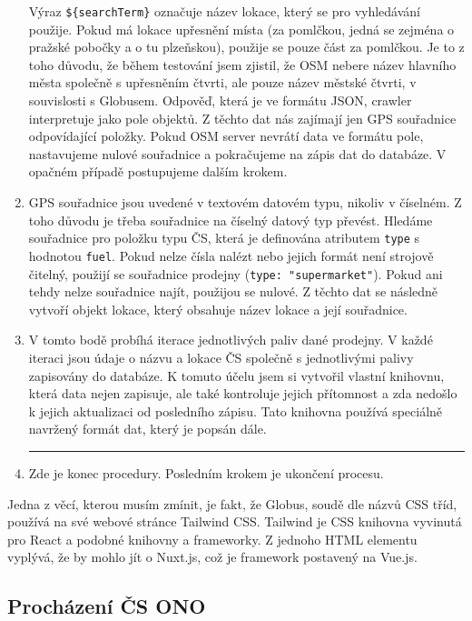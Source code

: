 \begin{enumerate}
        Výraz \texttt{\$\{searchTerm\}} označuje název lokace, který
        se pro vyhledávání použije. Pokud má lokace upřesnění místa
        (za pomlčkou, jedná se zejména o pražské pobočky a o tu plzeňskou),
        použije se pouze část za pomlčkou. Je to z toho důvodu, že během
        testování jsem zjistil, že OSM nebere název hlavního města společně
        s upřesněním čtvrti, ale pouze název městské čtvrti, v souvislosti
        s Globusem. Odpověď, která je ve formátu JSON, crawler interpretuje
        jako pole objektů. Z těchto dat nás zajímají jen GPS souřadnice
        odpovídající položky. Pokud OSM server nevrátí data ve formátu pole,
        nastavujeme nulové souřadnice a pokračujeme na zápis dat do databáze.
        V opačném případě postupujeme dalším krokem.
    \item GPS souřadnice jsou uvedené v textovém datovém typu, nikoliv
        v číselném. Z toho důvodu je třeba souřadnice na číselný datový typ
        převést. Hledáme souřadnice pro položku typu ČS, která je definována
        atributem \texttt{type} s hodnotou \texttt{fuel}. Pokud nelze čísla
        nalézt nebo jejich formát není strojově čitelný, použijí se
        souřadnice prodejny (\texttt{type: "supermarket"}). Pokud ani tehdy
        nelze souřadnice najít, použijou se nulové. Z těchto dat se následně
        vytvoří objekt lokace, který obsahuje název lokace a její souřadnice.
    \item V tomto bodě probíhá iterace jednotlivých paliv dané prodejny.
        V každé iteraci jsou údaje o názvu a lokace ČS společně
        s jednotlivými palivy zapisovány do databáze. K tomuto účelu jsem si
        vytvořil vlastní knihovnu, která data nejen zapisuje, ale také
        kontroluje jejich přítomnost a zda nedošlo k jejich aktualizaci
        od posledního zápisu. Tato knihovna používá speciálně navržený formát
        dat, který je popsán dále.
        \hrule
    \item Zde je konec procedury. Posledním krokem je ukončení procesu.
\end{enumerate}

Jedna z věcí, kterou musím zmínit, je fakt, že Globus, soudě dle názvů CSS
tříd, používá na své webové stránce Tailwind CSS. Tailwind je CSS knihovna
vyvinutá pro React a podobné knihovny a frameworky. Z jednoho HTML elementu
vyplývá, že by mohlo jít o Nuxt.js, což je framework postavený na Vue.js.

\subsection{Procházení ČS ONO}
\label{sec:crawling-ono}

